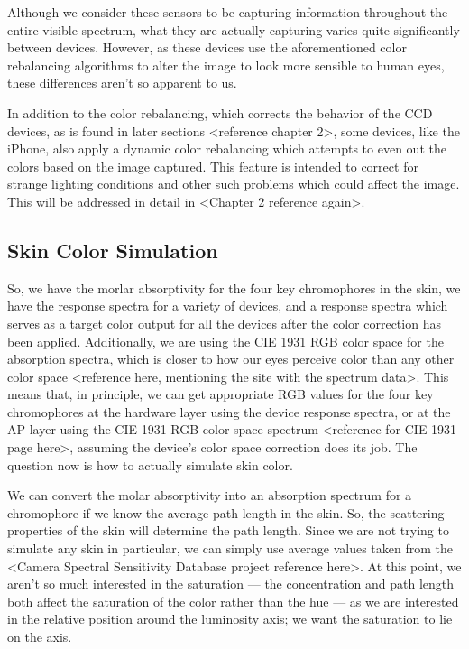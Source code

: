 Although we consider these sensors to be capturing information throughout the entire visible spectrum, what they are actually capturing varies quite significantly between devices. However, as these devices use the aforementioned color rebalancing algorithms to alter the image to look more sensible to human eyes, these differences aren't so apparent to us.

In addition to the color rebalancing, which corrects the behavior of the CCD devices, as is found in later sections <reference chapter 2>, some devices, like the iPhone, also apply a dynamic color rebalancing which attempts to even out the colors based on the image captured. This feature is intended to correct for strange lighting conditions and other such problems which could affect the image. This will be addressed in detail in <Chapter 2 reference again>.


\subsection{Skin Color Simulation}

So, we have the morlar absorptivity for the four key chromophores in the skin, we have the response spectra for a variety of devices, and a response spectra which serves as a target color output for all the devices after the color correction has been applied. Additionally, we are using the CIE 1931 RGB color space for the absorption spectra, which is closer to how our eyes perceive color than any other color space <reference here, mentioning the site with the spectrum data>. This means that, in principle, we can get appropriate RGB values for the four key chromophores at the hardware layer using the device response spectra, or at the AP layer using the CIE 1931 RGB color space spectrum <reference for CIE 1931 page here>, assuming the device's color space correction does its job. The question now is how to actually simulate skin color.

We can convert the molar absorptivity into an absorption spectrum for a chromophore if we know the average path length in the skin. So, the scattering properties of the skin will determine the path length. Since we are not trying to simulate any skin in particular, we can simply use average values taken from the <Camera Spectral Sensitivity Database project reference here>. At this point, we aren't so much interested in the saturation --- the concentration and path length both affect the saturation of the color rather than the hue --- as we are interested in the relative position around the luminosity axis; we want the saturation to lie on the axis.

